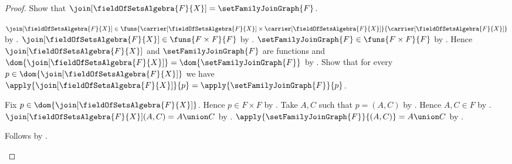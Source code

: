 \begin{proof}
    Show that
        $\join[\fieldOfSetsAlgebra{F}{X}]
            =\setFamilyJoinGraph{F}$.
    \begin{subproof}
        $\join[\fieldOfSetsAlgebra{F}{X}]
            \in\funs{
                \carrier[\fieldOfSetsAlgebra{F}{X}]
                    \times\carrier[\fieldOfSetsAlgebra{F}{X}]}
                {\carrier[\fieldOfSetsAlgebra{F}{X}]}$ by
            .
        $\join[\fieldOfSetsAlgebra{F}{X}]
            \in\funs{F\times F}{F}$ by
            .
        $\setFamilyJoinGraph{F}\in\funs{F\times F}{F}$ by
            .
        Hence $\join[\fieldOfSetsAlgebra{F}{X}]$ and
            $\setFamilyJoinGraph{F}$ are functions and
            $\dom{\join[\fieldOfSetsAlgebra{F}{X}]}
                =\dom{\setFamilyJoinGraph{F}}$ by
            .
        Show that for every $p\in
            \dom{\join[\fieldOfSetsAlgebra{F}{X}]}$ we have
            $\apply{\join[\fieldOfSetsAlgebra{F}{X}]}{p}
                =\apply{\setFamilyJoinGraph{F}}{p}$.
        \begin{subproof}
            Fix $p\in\dom{\join[\fieldOfSetsAlgebra{F}{X}]}$.
            Hence $p\in F\times F$ by .
            Take $A,C$ such that $p=(A,C)$ by
                .
            Hence $A,C\in F$ by .
            $\join[\fieldOfSetsAlgebra{F}{X}](A,C)=A\union C$ by
                .
            $\apply{\setFamilyJoinGraph{F}}{(A,C)}=A\union C$ by
                .
        \end{subproof}
        Follows by .
    \end{subproof}


\end{proof}
